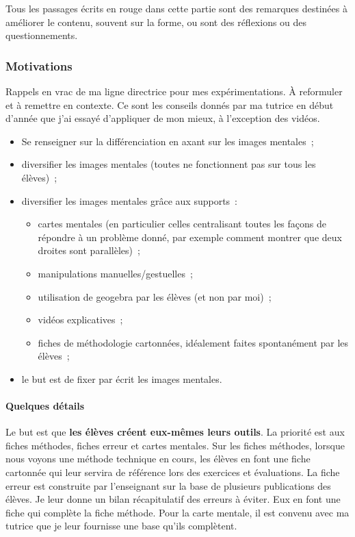 {\color{red}Tous les passages écrits en rouge dans cette partie sont des remarques destinées à améliorer le contenu, souvent sur la forme, ou sont des réflexions ou des questionnements.}

\subsubsection{Motivations}

{\color{red}Rappels en vrac de ma ligne directrice pour mes expérimentations. À reformuler et à remettre en contexte. Ce sont les conseils donnés par ma tutrice en début d'année que j'ai essayé d'appliquer de mon mieux, à l'exception des vidéos.}

\begin{itemize}
\item Se renseigner sur la différenciation en axant sur les images mentales ;
\item diversifier les images mentales (toutes ne fonctionnent pas sur tous les élèves) ;
\item diversifier les images mentales grâce aux supports :
\begin{itemize}
\item cartes mentales (en particulier celles centralisant toutes les façons de répondre à un problème donné, par exemple comment montrer que deux droites sont parallèles) ;
\item manipulations manuelles/gestuelles ;
\item utilisation de geogebra par les élèves (et non par moi) ;
\item vidéos explicatives ;
\item fiches de méthodologie cartonnées, idéalement faites spontanément par les élèves ;
\end{itemize}
\item le but est de fixer par écrit les images mentales.
\end{itemize}

\paragraph{Quelques détails}

Le but est que \textbf{les élèves créent eux-mêmes leurs outils}. La priorité est aux fiches méthodes, fiches erreur et cartes mentales. Sur les fiches méthodes, lorsque nous voyons une méthode technique en cours, les élèves en font une fiche cartonnée qui leur servira de référence lors des exercices et évaluations. La fiche erreur est construite par l'enseignant sur la base de plusieurs publications des élèves. Je leur donne un bilan récapitulatif des erreurs à éviter. Eux en font une fiche qui complète la fiche méthode. Pour la carte mentale, il est convenu avec ma tutrice que je leur fournisse une base qu'ils complètent.

